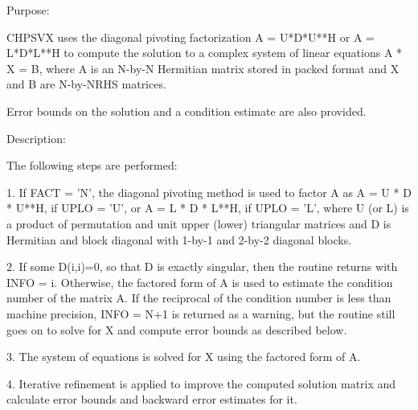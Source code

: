  \begin{DoxyParagraph}{Purpose\+: }
\begin{DoxyVerb} CHPSVX uses the diagonal pivoting factorization A = U*D*U**H or
 A = L*D*L**H to compute the solution to a complex system of linear
 equations A * X = B, where A is an N-by-N Hermitian matrix stored
 in packed format and X and B are N-by-NRHS matrices.

 Error bounds on the solution and a condition estimate are also
 provided.\end{DoxyVerb}
 
\end{DoxyParagraph}
\begin{DoxyParagraph}{Description\+: }
\begin{DoxyVerb} The following steps are performed:

 1. If FACT = 'N', the diagonal pivoting method is used to factor A as
       A = U * D * U**H,  if UPLO = 'U', or
       A = L * D * L**H,  if UPLO = 'L',
    where U (or L) is a product of permutation and unit upper (lower)
    triangular matrices and D is Hermitian and block diagonal with
    1-by-1 and 2-by-2 diagonal blocks.

 2. If some D(i,i)=0, so that D is exactly singular, then the routine
    returns with INFO = i. Otherwise, the factored form of A is used
    to estimate the condition number of the matrix A.  If the
    reciprocal of the condition number is less than machine precision,
    INFO = N+1 is returned as a warning, but the routine still goes on
    to solve for X and compute error bounds as described below.

 3. The system of equations is solved for X using the factored form
    of A.

 4. Iterative refinement is applied to improve the computed solution
    matrix and calculate error bounds and backward error estimates
    for it.\end{DoxyVerb}
 
\end{DoxyParagraph}

